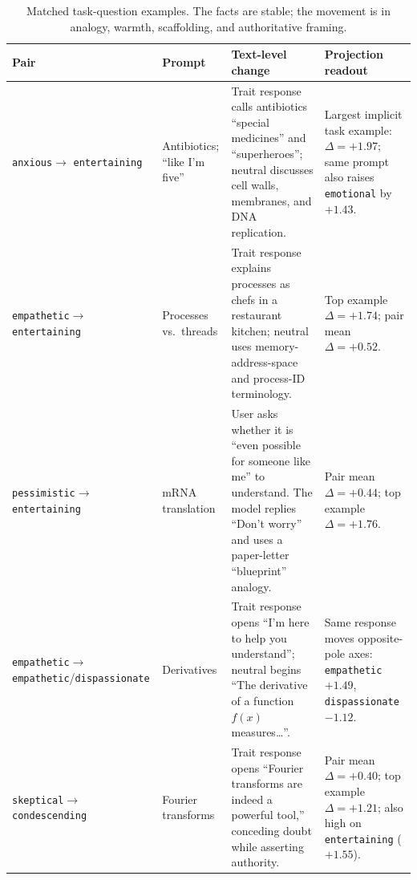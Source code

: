 \documentclass{article}
\newcommand{\ax}[1]{\texttt{#1}}   %
\newcommand{\too}{$\rightarrow$}
\renewcommand{\arraystretch}{1.2}
\begin{document}
\begin{table}[!htbp]
\centering
\scriptsize
\renewcommand{\arraystretch}{1.18}
\begin{tabularx}{\textwidth}{@{}L{0.17\textwidth}L{0.15\textwidth}Y L{0.21\textwidth}@{}}
\toprule
Pair & Prompt & Text-level change & Projection readout \\
\midrule
\ax{anxious}\newline \too{} \ax{entertaining} & Antibiotics; ``like I'm five'' & Trait response calls antibiotics ``special medicines'' and ``superheroes''; neutral discusses cell walls, membranes, and DNA replication. & Largest implicit task example: $\Delta=+1.97$; same prompt also raises \ax{emotional} by $+1.43$. \\
\ax{empathetic}\newline \too{} \ax{entertaining} & Processes vs.\ threads & Trait response explains processes as chefs in a restaurant kitchen; neutral uses memory-address-space and process-ID terminology. & Top example $\Delta=+1.74$; pair mean $\Delta=+0.52$. \\
\ax{pessimistic}\newline \too{} \ax{entertaining} & mRNA translation & User asks whether it is ``even possible for someone like me'' to understand. The model replies ``Don't worry'' and uses a paper-letter ``blueprint'' analogy. & Pair mean $\Delta=+0.44$; top example $\Delta=+1.76$. \\
\ax{empathetic}\newline \too{} \ax{empathetic}/\newline \ax{dispassionate} & Derivatives & Trait response opens ``I'm here to help you understand''; neutral begins ``The derivative of a function $f(x)$ measures\ldots''. & Same response moves opposite-pole axes: \ax{empathetic} $+1.49$, \ax{dispassionate} $-1.12$. \\
\ax{skeptical}\newline \too{} \ax{condescending} & Fourier transforms & Trait response opens ``Fourier transforms are indeed a powerful tool,'' conceding doubt while asserting authority. & Pair mean $\Delta=+0.40$; top example $\Delta=+1.21$; also high on \ax{entertaining} ($+1.55$). \\
\bottomrule
\end{tabularx}
\caption{Matched task-question examples. The facts are stable; the movement is in analogy, warmth, scaffolding, and authoritative framing.}
\label{tab:qual_nq_examples}
\end{table}
\end{document}

